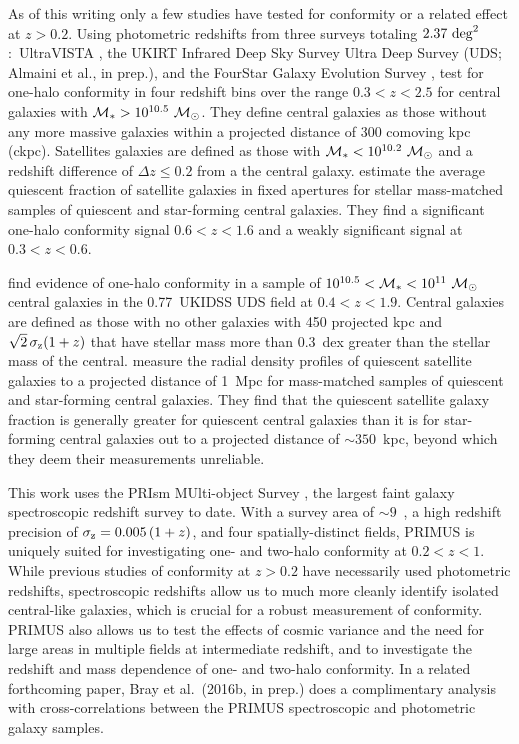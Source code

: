 As of this writing only a few studies have tested for conformity or a related effect at $z>0.2$.
Using photometric redshifts from three surveys totaling $2.37~\degsq$:~UltraVISTA \citep{McCracken12},
the UKIRT Infrared Deep Sky Survey \citep[UKIDSS;][]{Lawrence07} Ultra Deep Survey (UDS; Almaini et al., in prep.),
and the FourStar Galaxy Evolution Survey \citep[ZFOURGE;][]{Spitler12}, \citet{Kawinwanichakij16} test for one-halo conformity in four redshift bins over the range ${0.3 < z < 2.5}$ for central galaxies with ${\mstar > 10^{10.5}~\msun}$.
They define central galaxies as those without any more massive galaxies within a projected distance of 300 comoving kpc (ckpc).
Satellites galaxies are defined as those with ${\mstar < 10^{10.2}~\msun}$ and a redshift difference of ${\Delta z \le 0.2}$ from a the central galaxy.
\citet{Kawinwanichakij16} estimate the average quiescent fraction of satellite galaxies in fixed apertures for stellar mass-matched samples of quiescent and star-forming central galaxies.
They find a significant one-halo conformity signal ${0.6 < z < 1.6}$ and a weakly significant signal at ${0.3 < z < 0.6}$.

\citet{Hartley15} find evidence of one-halo conformity in a sample of ${10^{10.5}<\mstar<10^{11}~\msun}$ central galaxies in the 0.77~\degsq UKIDSS UDS field at ${0.4 < z < 1.9}$.
Central galaxies are defined as those with no other galaxies with 450 projected kpc and ${\sqrt{2}\,\sigmaz(1+z)}$ that have stellar mass more than 0.3~dex greater than the stellar mass of the central.
\citet{Hartley15} measure the radial density profiles of quiescent satellite galaxies to a projected distance of 1~Mpc for mass-matched samples of quiescent and star-forming central galaxies.
They find that the quiescent satellite galaxy fraction is generally greater for quiescent central galaxies than it is for star-forming central galaxies out to a projected distance of $\sim350$~kpc, beyond which they deem their measurements unreliable.

This work uses the PRIsm MUlti-object Survey \citep[PRIMUS;][]{Coil11, Cool13}, the largest faint galaxy spectroscopic redshift survey to date.
With a survey area of $\sim9$~\degsq, a high redshift precision of $\sigmaz=0.005\,(1+z)$, and four spatially-distinct fields, PRIMUS is uniquely suited for investigating one- and two-halo conformity at $0.2<z<1$.
While previous studies of conformity at $z>0.2$ have necessarily used photometric redshifts, spectroscopic redshifts allow us to much more cleanly identify isolated central-like galaxies, which is crucial for a robust measurement of conformity.
PRIMUS also allows us to test the effects of cosmic variance and the need for large areas in multiple fields at intermediate redshift,
and to investigate the redshift and mass dependence of one- and two-halo conformity.
In a related forthcoming paper, Bray et al.~(2016b, in prep.) does a complimentary analysis with cross-correlations between the PRIMUS spectroscopic and photometric galaxy samples.


